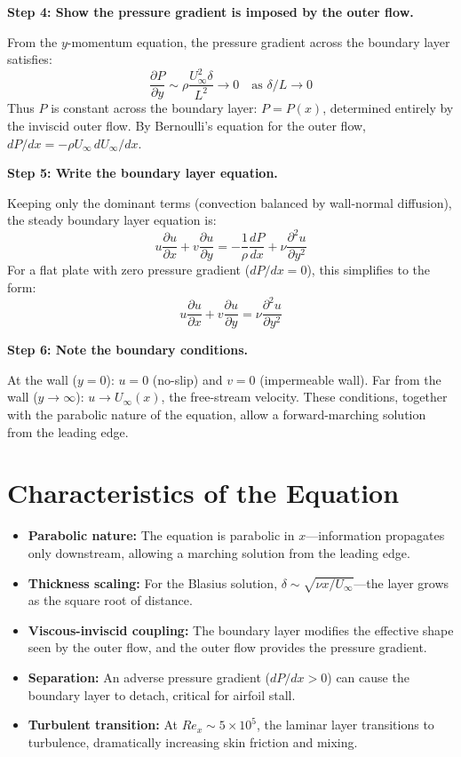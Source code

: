 \documentclass[11pt,openright]{book}
\begin{document}
\textbf{Step 4: Show the pressure gradient is imposed by the outer flow.}

From the $y$-momentum equation, the pressure gradient across the boundary layer satisfies:
\begin{equation}
\frac{\partial P}{\partial y} \sim \rho\frac{U_\infty^2 \delta}{L^2} \to 0 \quad \text{as } \delta/L \to 0
\end{equation}
Thus $P$ is constant across the boundary layer: $P = P(x)$, determined entirely by the inviscid outer flow. By Bernoulli's equation for the outer flow, $dP/dx = -\rho U_\infty\, dU_\infty/dx$.

\textbf{Step 5: Write the boundary layer equation.}

Keeping only the dominant terms (convection balanced by wall-normal diffusion), the steady boundary layer equation is:
\begin{equation}
u\frac{\partial u}{\partial x} + v\frac{\partial u}{\partial y} = -\frac{1}{\rho}\frac{dP}{dx} + \nu\frac{\partial^2 u}{\partial y^2}
\end{equation}
For a flat plate with zero pressure gradient ($dP/dx = 0$), this simplifies to the form:
\begin{equation}
\boxed{u\frac{\partial u}{\partial x} + v\frac{\partial u}{\partial y} = \nu\frac{\partial^2 u}{\partial y^2}}
\end{equation}

\textbf{Step 6: Note the boundary conditions.}

At the wall ($y = 0$): $u = 0$ (no-slip) and $v = 0$ (impermeable wall). Far from the wall ($y \to \infty$): $u \to U_\infty(x)$, the free-stream velocity. These conditions, together with the parabolic nature of the equation, allow a forward-marching solution from the leading edge.

\section*{Characteristics of the Equation}

\begin{itemize}
\item \textbf{Parabolic nature:} The equation is parabolic in $x$---information propagates only downstream, allowing a marching solution from the leading edge.
\item \textbf{Thickness scaling:} For the Blasius solution, $\delta \sim \sqrt{\nu x / U_\infty}$---the layer grows as the square root of distance.
\item \textbf{Viscous-inviscid coupling:} The boundary layer modifies the effective shape seen by the outer flow, and the outer flow provides the pressure gradient.
\item \textbf{Separation:} An adverse pressure gradient ($dP/dx > 0$) can cause the boundary layer to detach, critical for airfoil stall.
\item \textbf{Turbulent transition:} At $Re_x \sim 5 \times 10^5$, the laminar layer transitions to turbulence, dramatically increasing skin friction and mixing.
\end{itemize}
\end{document}
